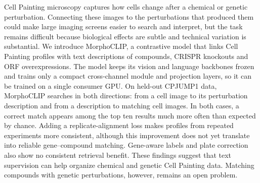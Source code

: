 Cell Painting microscopy captures how cells change after a chemical or genetic perturbation.
Connecting these images to the perturbations that produced them could make large imaging screens
easier to search and interpret, but the task remains difficult because biological effects are
subtle and technical variation is substantial.
We introduce MorphoCLIP, a contrastive model that links Cell Painting profiles with text
descriptions of compounds, CRISPR knockouts and ORF overexpressions. The model keeps its vision
and language backbones frozen and trains only a compact cross-channel module and projection
layers, so it can be trained on a single consumer GPU.
On held-out CPJUMP1 data, MorphoCLIP searches in both directions: from a cell image to its
perturbation description and from a description to matching cell images. In both cases, a correct
match appears among the top ten results much more often than expected by chance. Adding a
replicate-alignment loss makes profiles from repeated experiments more consistent, although this
improvement does not yet translate into reliable gene--compound matching. Gene-aware labels and
plate correction also show no consistent retrieval benefit.
These findings suggest that text supervision can help organize chemical and genetic Cell Painting
data. Matching compounds with genetic perturbations, however, remains an open problem.
